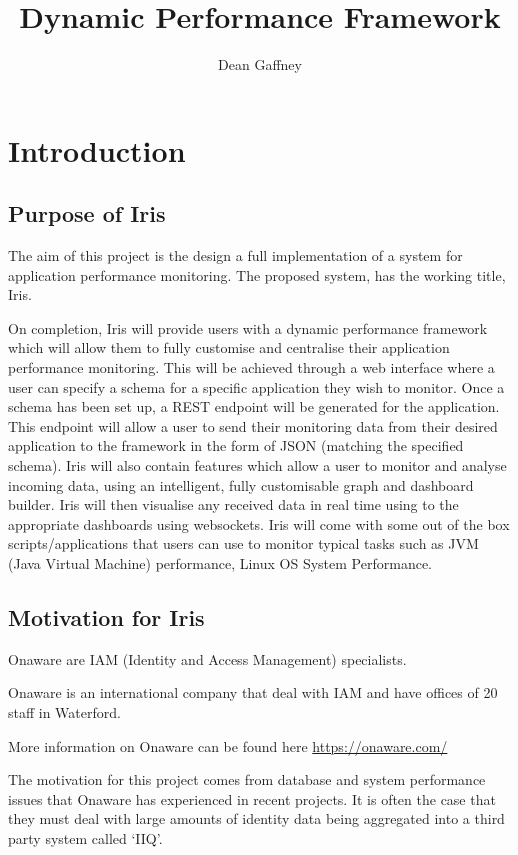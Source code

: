 \documentclass[12pt,a4paper,titlepage]{report}
\begin{document}
\title{Dynamic Performance Framework}
\author{Dean Gaffney}
\maketitle

\tableofcontents
\listoftables
\listoffigures

\chapter{Introduction}

\section{Purpose of Iris}
The aim of this project is the design a full implementation of a system for application performance monitoring. The proposed system, has the working title,  Iris. 

On completion, Iris will provide users with a dynamic performance framework which will allow them to fully customise and centralise their application performance monitoring. This will be achieved through a web interface where a user can specify a schema for a specific application they wish to monitor. Once a schema has been set up, a REST endpoint will be generated for the application. This endpoint will allow a user to send their monitoring data from their desired application to the framework in the form of JSON (matching the specified schema). Iris will also contain features which allow a user to monitor and analyse incoming data, using an intelligent, fully customisable graph and dashboard builder. Iris will then visualise any received data in real time using to the appropriate dashboards using websockets. Iris will come with some out of the box scripts/applications that users can use to monitor typical tasks such as JVM (Java Virtual Machine) performance, Linux OS System Performance.

\section{Motivation for Iris}
Onaware are IAM (Identity and Access Management) specialists.

Onaware is an international company that deal with IAM and have offices of 20 staff in Waterford.

More information on Onaware can be found here \url{https://onaware.com/}

The motivation for this project comes from database and system performance issues that Onaware has experienced in recent projects. It is often the case that they must deal with large amounts of identity data being aggregated into a third party system called ‘IIQ’. 
\end{document}
